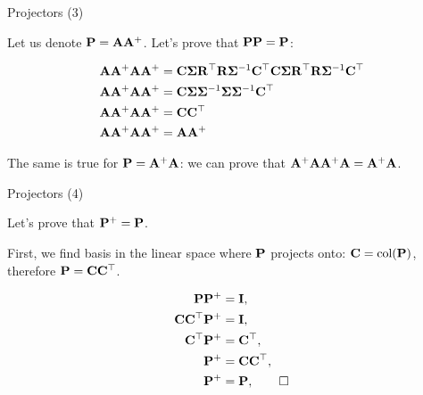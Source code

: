 \documentclass{beamer}
\begin{document}
\begin{frame}{Projectors (3)}
	\begin{flushleft}
		
		Let us denote $\mathbf{P} = \mathbf{A}\mathbf{A}^+$. 
		Let's prove that $\mathbf{P}\mathbf{P} = \mathbf{P}$:
		
		\begin{align}
			\mathbf{A} \mathbf{A}^+ \mathbf{A} \mathbf{A}^+ &= 
			\mathbf{C} \mathbf{\Sigma} \mathbf{R}^\top 
			\mathbf{R} \mathbf{\Sigma}^{-1} \mathbf{C}^\top 
			\mathbf{C} \mathbf{\Sigma} \mathbf{R}^\top 
			\mathbf{R} \mathbf{\Sigma}^{-1} \mathbf{C}^\top
			\\
			\mathbf{A} \mathbf{A}^+ \mathbf{A} \mathbf{A}^+ &= 
			\mathbf{C} \mathbf{\Sigma} \mathbf{\Sigma}^{-1}\mathbf{\Sigma} \mathbf{\Sigma}^{-1} \mathbf{C}^\top
			\\
			\mathbf{A} \mathbf{A}^+ \mathbf{A} \mathbf{A}^+ &= 
			\mathbf{C} \mathbf{C}^\top
			\\
			\mathbf{A} \mathbf{A}^+ \mathbf{A} \mathbf{A}^+ &= 
			\mathbf{A} \mathbf{A}^+
		\end{align}
		
		
		The same is true for $\mathbf{P} = \mathbf{A}^+\mathbf{A}$: we can prove that $\mathbf{A}^+\mathbf{A} \mathbf{A}^+\mathbf{A} = \mathbf{A}^+\mathbf{A}$.
		
	\end{flushleft}
\end{frame}





\begin{frame}{Projectors (4)}
	\begin{flushleft}
		
		Let's prove that $\mathbf{P}^+ = \mathbf{P}$. 
		
		First, we find basis in the linear space where $\mathbf{P}$ projects onto: $\mathbf{C} = \text{col}(\mathbf{P})$, therefore $\mathbf{P} = \mathbf{C}\mathbf{C}^\top$.
		
		\begin{align}
			\mathbf{P}\mathbf{P}^+ &= \mathbf{I}, \\
			\mathbf{C}\mathbf{C}^\top\mathbf{P}^+ &= \mathbf{I}, \\
			\mathbf{C}^\top \mathbf{P}^+ &= \mathbf{C}^\top, \\
			\mathbf{P}^+ &= \mathbf{C} \mathbf{C}^\top, \\
			\mathbf{P}^+ &= \mathbf{P}, \qed
		\end{align}
		
		
	\end{flushleft}
\end{frame}
\end{document}
